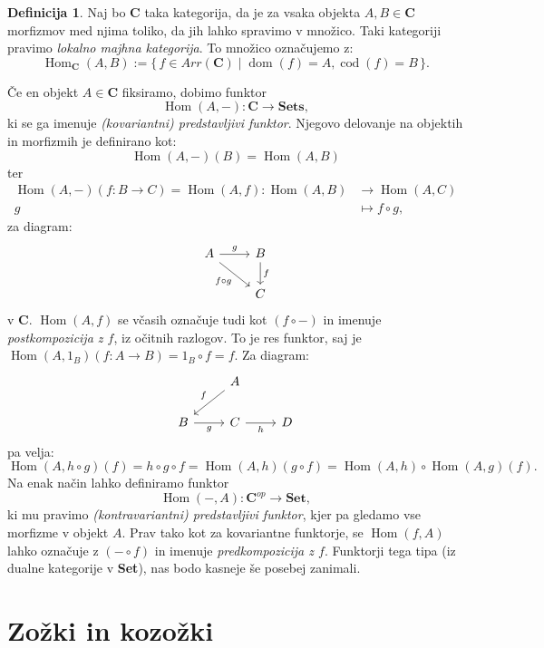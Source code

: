 \documentclass[12pt,a4paper]{book}
\theoremstyle{definition}
\newtheorem{definicija}{Definicija}[chapter]
\theoremstyle{plain}
\theoremstyle{definition}
\theoremstyle{remark}
\newcommand{\cat}[1]{\textbf{#1}}
\DeclareMathOperator{\Hom}{Hom}
\DeclareMathOperator{\dom}{dom}
\DeclareMathOperator{\cod}{cod}
\renewcommand{\set}[1]{\{\,#1\,\}}
\begin{document}
\begin{definicija}

Naj bo $\cat{C}$ taka kategorija, da je za vsaka objekta $A,B \in \cat{C}$ morfizmov med njima toliko, da jih lahko spravimo v množico. Taki kategoriji pravimo \emph{lokalno majhna kategorija}. To množico označujemo z:
$$\Hom_{\cat{C}}(A,B) := \set{f \in Arr(\cat{C}) \mid \dom(f) = A, \cod(f) = B}.$$
\end{definicija}
Če en objekt $A \in \cat{C}$ fiksiramo, dobimo funktor
$$\Hom(A,-) : \cat{C} \to \cat{Sets},$$
ki se ga imenuje \emph{(kovariantni) predstavljivi funktor}. Njegovo delovanje na objektih in morfizmih je definirano kot:
$$\Hom(A,-)(B) = \Hom(A,B)$$
ter
\begin{align*}
\Hom(A,-)(f : B \to C) = \Hom(A,f): \Hom(A,B) &\to \Hom(A,C) \\
g &\mapsto f \circ g,
\end{align*}
za diagram:
$$ \begin{tikzcd}
A \ar[r, "g"] \ar[rd, "f \circ g"'] & B \ar[d, "f"] \\
& C
\end{tikzcd} $$
v $\cat{C}$. $\Hom(A,f)$ se včasih označuje tudi kot $(f \circ -)$ in imenuje \emph{postkompozicija z $f$}, iz očitnih razlogov.
To je res funktor, saj je $\Hom(A,1_B)(f:A \to B) = 1_B \circ f = f$. Za diagram: 
$$ \begin{tikzcd}
& A \ar[dl, "f"'] & \\
B \ar[r, "g"'] & C \ar[r, "h"'] & D
\end{tikzcd} $$
pa velja:
$$
\Hom(A,h \circ g)(f) = h \circ g \circ f = \Hom(A,h)(g \circ f) = \Hom(A,h) \circ \Hom(A,g)(f).
$$
Na enak način lahko definiramo funktor
$$\Hom(-,A) : \cat{C}^{op} \to \cat{Set},$$
ki mu pravimo \emph{(kontravariantni) predstavljivi funktor},
kjer pa gledamo vse morfizme v objekt $A$. Prav tako kot za kovariantne funktorje, se $\Hom(f,A)$ lahko označuje z $(- \circ f)$ in imenuje \emph{predkompozicija z $f$}. Funktorji tega tipa (iz dualne kategorije v \cat{Set}), nas bodo kasneje še posebej zanimali.

\section{Zožki in kozožki}
\end{document}
